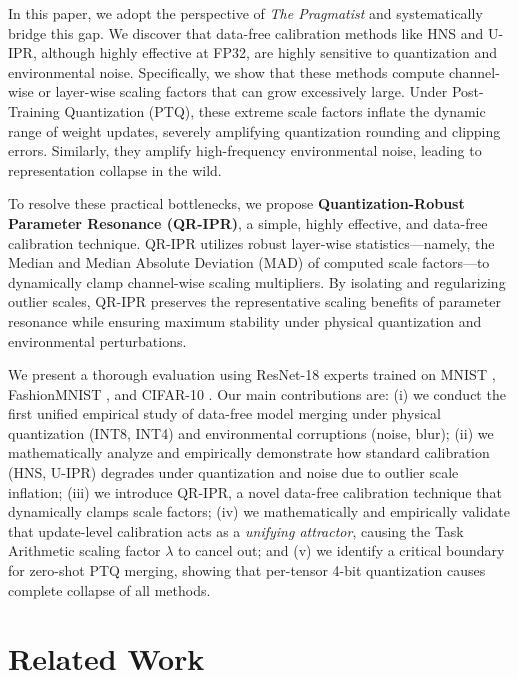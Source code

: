 \documentclass{article}
\theoremstyle{plain}
\theoremstyle{definition}
\theoremstyle{remark}
\begin{document}
In this paper, we adopt the perspective of \emph{The Pragmatist} and systematically bridge this gap. We discover that data-free calibration methods like HNS and U-IPR, although highly effective at FP32, are highly sensitive to quantization and environmental noise. Specifically, we show that these methods compute channel-wise or layer-wise scaling factors that can grow excessively large. Under Post-Training Quantization (PTQ), these extreme scale factors inflate the dynamic range of weight updates, severely amplifying quantization rounding and clipping errors. Similarly, they amplify high-frequency environmental noise, leading to representation collapse in the wild.

To resolve these practical bottlenecks, we propose \textbf{Quantization-Robust Parameter Resonance (QR-IPR)}, a simple, highly effective, and data-free calibration technique. QR-IPR utilizes robust layer-wise statistics—namely, the Median and Median Absolute Deviation (MAD) of computed scale factors—to dynamically clamp channel-wise scaling multipliers. By isolating and regularizing outlier scales, QR-IPR preserves the representative scaling benefits of parameter resonance while ensuring maximum stability under physical quantization and environmental perturbations.

We present a thorough evaluation using ResNet-18 \cite{he2016deep} experts trained on MNIST \cite{lecun1998gradient}, FashionMNIST \cite{xiao2017fashion}, and CIFAR-10 \cite{krizhevsky2009learning}. Our main contributions are: (i) we conduct the first unified empirical study of data-free model merging under physical quantization (INT8, INT4) and environmental corruptions (noise, blur); (ii) we mathematically analyze and empirically demonstrate how standard calibration (HNS, U-IPR) degrades under quantization and noise due to outlier scale inflation; (iii) we introduce QR-IPR, a novel data-free calibration technique that dynamically clamps scale factors; (iv) we mathematically and empirically validate that update-level calibration acts as a \emph{unifying attractor}, causing the Task Arithmetic scaling factor $\lambda$ to cancel out; and (v) we identify a critical boundary for zero-shot PTQ merging, showing that per-tensor 4-bit quantization causes complete collapse of all methods.

\vspace{-2.0mm}
\section{Related Work}
\label{sec:related}
\vspace{-2.5mm}
\end{document}
